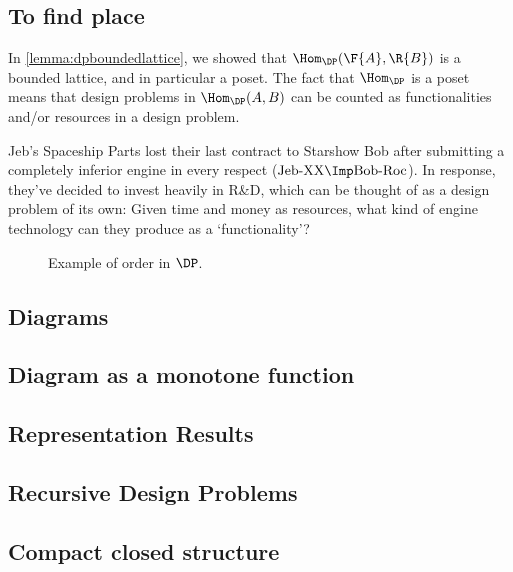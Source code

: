 \subsection{To find place}
\begin{remark}
In \cref{lemma:dpboundedlattice}, we showed that $\Hom_{\DP}(\F{A},\R{B})$ is a bounded lattice, and in particular a poset. The fact that $\Hom_\DP$ is a poset means that design problems in $\Hom_\DP(A,B)$ can be counted as functionalities and/or resources in a design problem.
\end{remark}

\begin{example}\label{ex:r&d}
Jeb's Spaceship Parts lost their last contract to Starshow Bob after submitting a completely inferior engine in every respect ($\text{Jeb-XX} \Imp \text{Bob-Roc}$). In response, they've decided to invest heavily in R\&D, which can be thought of as a design problem of its own: Given time and money as resources, what kind of engine technology can they produce as a `functionality'?
\end{example}

\begin{figure}[h!]
\begin{center}
\end{center}
\caption{Example of order in $\DP$. \label{fig:orderdp}}
\end{figure}

\subsection{Diagrams}
\subsection{Diagram as a monotone function}
\subsection{Representation Results}
\todo{}

\subsection{Recursive Design Problems}

\subsection{Compact closed structure}\label{sec:compact_closed}

